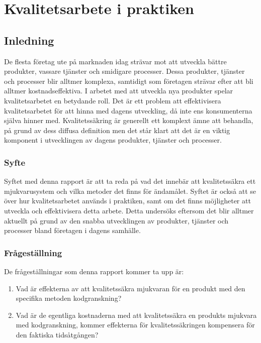 \chapter{Kvalitetsarbete i praktiken}
\label{cha:indiv-report-wallstrom}


\section{Inledning}
\label{sec:introduction-wallstrom}

De flesta företag ute på marknaden idag strävar mot att utveckla bättre produkter, vassare tjänster och smidigare processer. Dessa produkter, tjänster och processer blir alltmer komplexa, samtidigt som företagen strävar efter att bli alltmer kostnadseffektiva. I arbetet med att utveckla nya produkter spelar kvalitetsarbetet en betydande roll. Det är ett problem att effektivisera kvalitetsarbetet för att hinna med dagens utveckling, då inte ens konsumenterna själva hinner med. Kvalitetssäkring är generellt ett komplext ämne att behandla, på grund av dess diffusa definition men det står klart att det är en viktig komponent i utvecklingen av dagens produkter, tjänster och processer.

\subsection{Syfte}
\label{sec:purpose-wallstrom}

Syftet med denna rapport är att ta reda på vad det innebär att kvalitetssäkra ett mjukvarusystem och vilka metoder det finns för ändamålet. Syftet är också att se över hur kvalitetsarbetet används i praktiken, samt om det finns möjligheter att utveckla och effektivisera detta arbete. Detta undersöks eftersom det blir alltmer aktuellt på grund av den snabba utvecklingen av produkter, tjänster och processer bland företagen i dagens samhälle.

\subsection{Frågeställning}
\label{sec:issue-wallstrom}

De frågeställningar som denna rapport kommer ta upp är:

\begin{enumerate}
	\item Vad är effekterna av att kvalitetssäkra mjukvaran för en produkt med den specifika metoden kodgranskning?
	\item Vad är de egentliga kostnaderna med att kvalitetssäkra en produkts mjukvara med kodgranskning, kommer effekterna för kvalitetssäkringen kompensera för den faktiska tidsåtgången?
\end{enumerate}

